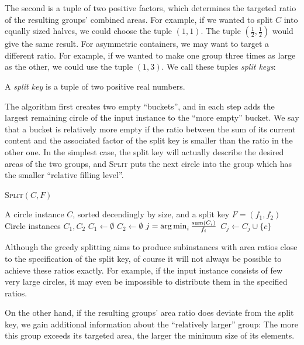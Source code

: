 \documentclass[a4paper,style=print,bibliography=totoc,nexus,lnum,extramargin]{tubsbook}
\begin{document}
The second is a tuple of two positive factors, which determines the targeted ratio of the resulting groups' combined areas. For example, if we wanted to split $C$ into equally sized halves, we could choose the tuple $(1,1)$. The tuple $(\frac 1 2,\frac 1 2)$ would give the same result.
For asymmetric containers, we may want to target a different ratio. For example, if we wanted to make one group three times as large as the other, we could use the tuple $(1,3)$. We call these tuples \emph{split keys}:

\begin{definition}
    A \emph{split key} is a tuple of two positive real numbers.
\end{definition}

The algorithm first creates two empty “buckets”, and in each step adds the largest remaining circle of the input instance to the “more empty” bucket. We say that a bucket is relatively more empty if the ratio between the sum of its current content and the associated factor of the split key is smaller than the ratio in the other one.
In the simplest case, the split key will actually describe the desired areas of the two groups, and \textsc{Split} puts the next circle into the group which has the smaller “relative filling level”.

\begin{algorithm}
    \caption{\textsc{Split}$(C,F)$}
    \label{alg:split}
    \begin{algorithmic}
        \Require A circle instance $C$, sorted decendingly by size, and a split key $F = (f_1, f_2)$
        \Ensure Circle instances $C_1, C_2$
        \State $C_1 \gets \emptyset$
        \State $C_2 \gets \emptyset$
            \State $j = \operatorname*{arg\,min}_{i} \frac{\operatorname{sum}(C_i)}{f_i}$
            \State $C_j \gets C_j \cup \{c\}$
        \EndFor
    \end{algorithmic}
\end{algorithm}

Although the greedy splitting aims to produce subinstances with area ratios close to the specification of the split key, of course it will not always be possible to achieve these ratios exactly. For example, if the input instance consists of few very large circles, it may even be impossible to distribute them in the specified ratios.

On the other hand, if the resulting groups' area ratio does deviate from the split key, we gain additional information about the “relatively larger” group: The more this group exceeds its targeted area, the larger the minimum size of its elements.
\end{document}
